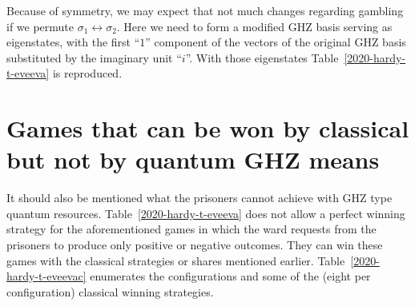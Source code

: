 \documentclass[sn-mathphys]{sn-jnl}%
\theoremstyle{thmstyleone}%
\theoremstyle{thmstyletwo}%
\theoremstyle{thmstylethree}%
\begin{document}
Because of symmetry, we may expect that not much changes regarding gambling if we permute $\sigma_1 \leftrightarrow \sigma_2$. Here we need to form a
modified GHZ basis serving as eigenstates, with the first ``$1$'' component of the vectors of the original GHZ basis substituted by the imaginary unit ``$i$''.
With those eigenstates Table~\ref{2020-hardy-t-eveeva} is reproduced.


\section{Games that can be won by classical but not by quantum GHZ means}
\label{2020-ghz-gtcbwbcbnbqm}

It should also be mentioned what the prisoners cannot achieve with GHZ type quantum resources.
Table~\ref{2020-hardy-t-eveeva} does not allow a
perfect winning strategy for the aforementioned games in which the ward requests from the prisoners to produce only positive or negative outcomes.
They can win these games with the classical strategies or shares mentioned earlier.
Table~\ref{2020-hardy-t-eveevac} enumerates the configurations
and some of the (eight per configuration) classical winning strategies.
\end{document}

